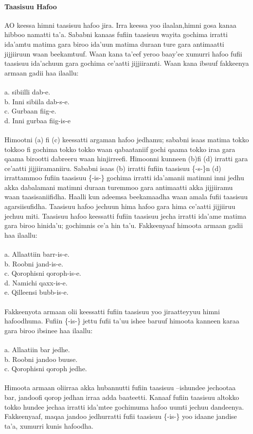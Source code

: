 \documentclass[11pt,b5paper]{book}
\begin{document}
\paragraph{Taasisuu Hafoo}
AO keessa himni taasisuu hafoo jira. Irra keessa yoo ilaalan,himni gosa kanaa hibboo namatti ta’a. Sababni kanaas fufiin taasisuu wayita gochima irratti ida’amtu matima gara biroo ida’uun matima duraan ture gara antimaatti jijjiiruun waan beekamtuuf. Waan kana ta’eef yeroo baay’ee xumurri hafoo
fufii taasisuu ida’achuun gara gochima ce’aatti jijjiiramti. Waan kana ibsuuf fakkeenya armaan gadii haa ilaallu: \\
\\
a. sibiilli dab-e.\\
b. Inni sibiila dab-s-e.\\
c. Gurbaan fiig-e.\\
d. Inni gurbaa fiig-is-e\\
\\
Himootni (a) fi (c) keessatti argaman hafoo jedhamu; sababni isaas matima tokko tokkoo fi gochima tokko tokko waan qabaataniif gochi qaama tokko iraa gara qaama birootti dabreeru waan hinjirreefi. Himoonni kunneen (b)fi (d) irratti gara ce’aatti jijjiiramaniiru. Sababni isaas (b) irratti fufiin
taasisuu \{-s-\}n (d) irrattammoo fufiin taasisuu \{-is-\} gochima irratti ida’amanii matimni inni jedhu akka dabalamani matimni duraan turemmoo gara antimaatti akka jijjiiramu waan taasisaniifidha. Haalli kun adeemsa beekamaadha waan amala fufii taasisuu agarsiisufidha. Taasisuu hafoo jechuun hima
hafoo gara hima ce’aatti jijjiiruu jechuu miti. Taasisuu hafoo keessatti fufiin taasisuu jecha irratti ida’ame matima gara biroo hinida’u; gochimnis ce’a hin ta’u. Fakkeenyaaf himoota armaan gadii haa ilaallu:\\
\\
a. Allaattiin barr-is-e.\\
b. Roobni jand-is-e.\\
c. Qorophisni qoroph-is-e.\\
d. Namichi qaxx-is-e.\\
e. Qilleensi bubb-is-e. \\
\\
Fakkeenyota armaan olii keessatti fufiin taasisuu yoo jiraatteyyuu himni hafoodhuma. Fufiin \{-is-\} jettu fufii ta’uu ishee baruuf himoota kanneen karaa gara biroo ibsinee haa ilaallu: \\
\\
a. Allaatiin bar jedhe.\\
b. Roobni jandoo buuse.\\
c. Qorophisni qoroph jedhe.\\
\\
Himoota armaan oliirraa akka hubannutti fufiin taasisuu –ishundee jechootaa bar, jandoofi qorop jedhan irraa adda baateetti. Kanaaf fufiin taasisuu altokko tokko hundee jechaa irratti ida’mtee gochimuma hafoo uumti jechuu dandeenya. Fakkeenyaaf, maqaa jandoo jedhurratti fufii taasisuu \{-is-\} yoo
idaane jandise ta’a, xumurri kunis hafoodha.
\end{document}
